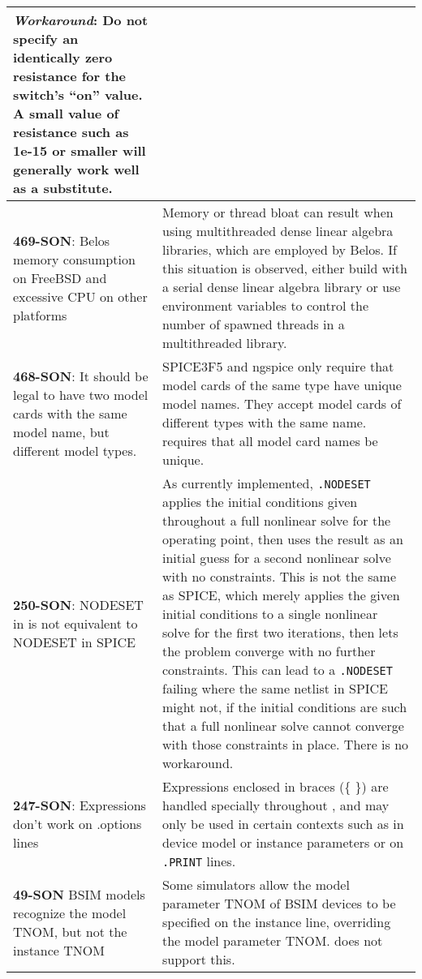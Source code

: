 {\begin{longtable}[h] {>{\raggedright\small}m{2in}|>{\raggedright\let\\\tabularnewline\small}m{3.5in}}
\textbf{\textit{Workaround}}: Do not specify an identically zero resistance
for the switch's ``on'' value.  A small value of resistance such as
1e-15 or smaller will generally work well as a substitute. \\ \hline


\textbf{469-SON}: Belos memory consumption on FreeBSD and excessive CPU on other
platforms & Memory or thread bloat can result when using multithreaded
dense linear algebra libraries, which are employed by Belos.  If this
situation is observed, either build
\Xyce{} with a serial dense linear algebra library or use environment variables
to control the number of spawned threads in a multithreaded library.
\\ \hline


\textbf{468-SON}: It should be legal to have two model cards with the same model
name, but different model types. & SPICE3F5 and ngspice only require
that model cards of the same type have unique model names. They accept
model cards of different types with the same name.  \Xyce{} requires
that all model card names be unique.
\\ \hline


\textbf{250-SON}: NODESET in \Xyce{} is not equivalent to NODESET in SPICE & As
currently implemented, \texttt{.NODESET} applies the initial
conditions given throughout a full nonlinear solve for the operating
point, then uses the result as an initial guess for a second nonlinear
solve with no constraints.  This is not the same as SPICE, which
merely applies the given initial conditions to a single nonlinear
solve for the first two iterations, then lets the problem converge
with no further constraints.  This can lead to
a \Xyce{} \texttt{.NODESET} failing where the same netlist in SPICE
might not, if the initial conditions are such that a full nonlinear
solve cannot converge with those constraints in place.  There is no
workaround.
\\ \hline

\textbf{247-SON}: Expressions don't work on .options lines & Expressions
enclosed in braces (\{ \}) are handled specially throughout \Xyce{},
and may only be used in certain contexts such as in device model or
instance parameters or on \texttt{.PRINT} lines.
\\ \hline


\textbf{49-SON} \Xyce{} BSIM models recognize the model TNOM, but not the
instance TNOM & Some simulators allow the model parameter TNOM of BSIM
devices to be specified on the instance line, overriding the model
parameter TNOM.  \Xyce{} does not support this.
\\ \hline



\end{longtable}}
